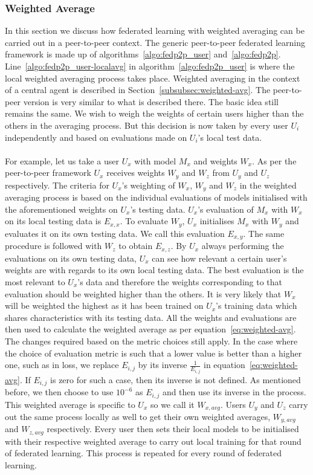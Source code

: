 \documentclass[12pt]{article}
\begin{document}
\subsubsection{Weighted Average}
In this section we discuss how federated learning with weighted averaging can be carried out in a peer-to-peer context. The generic peer-to-peer federated learning framework is made up of algorithms~\ref{algo:fedp2p_user} and~\ref{algo:fedp2p}. Line~\ref{algo:fedp2p_user-localavg} in algorithm~\ref{algo:fedp2p_user} is where the local weighted averaging process takes place. Weighted averaging in the context of a central agent is described in Section~\ref{subsubsec:weighted-avg}. The peer-to-peer version is very similar to what is described there. The basic idea still remains the same. We wish to weigh the weights of certain users higher than the others in the averaging process. But this decision is now taken by every user $U_i$ independently and based on evaluations made on $U_i$'s local test data.
\\\\
For example, let us take a user $U_x$ with model $M_x$ and weights $W_x$. As per the peer-to-peer framework $U_x$ receives weights $W_y$ and $W_z$ from $U_y$ and $U_z$ respectively. The criteria for $U_x$'s weighting of $W_x$, $W_y$ and $W_z$ in the weighted averaging process is based on the individual evaluations of models initialised with the aforementioned weights on $U_x$'s testing data. $U_x$'s evaluation of $M_x$ with $W_x$ on its local testing data is $E_{x,x}$. To evaluate $W_y$, $U_x$ initialises $M_x$ with $W_y$ and evaluates it on its own testing data. We call this evaluation $E_{x,y}$. The same procedure is followed with $W_z$ to obtain $E_{x,z}$. By $U_x$ always performing the evaluations on its own testing data, $U_x$ can see how relevant a certain user's weights are with regards to its own local testing data. The best evaluation is the most relevant to $U_x$'s data and therefore the weights corresponding to that evaluation should be weighted higher than the others. It is very likely that $W_x$ will be weighted the highest as it has been trained on $U_x$'s training data which shares characteristics with its testing data. All the weights and evaluations are then used to calculate the weighted average as per equation~\ref{eq:weighted-avg}. The changes required based on the metric choices still apply. In the case where the choice of evaluation metric is such that a lower value is better than a higher one, such as in loss, we replace $E_{i,j}$ by its inverse $\frac{1}{E_{i,j}}$ in equation~\ref{eq:weighted-avg}. If $E_{i,j}$ is zero for such a case, then its inverse is not defined. As mentioned before, we then choose to use $10^{-6}$ as $E_{i,j}$ and then use its inverse in the process. This weighted average is specific to $U_x$ so we call it $W_{x, avg}$. Users $U_y$ and $U_z$ carry out the same process locally as well to get their own weighted averages, $W_{y, avg}$ and $W_{z, avg}$ respectively. Every user then sets their local models to be initialised with their respective weighted average to carry out local training for that round of federated learning. This process is repeated for every round of federated learning.
\end{document}
